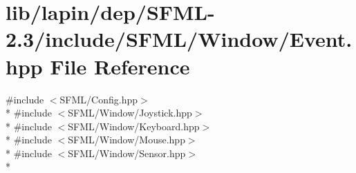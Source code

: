 \hypertarget{lib_2lapin_2dep_2_s_f_m_l-2_83_2include_2_s_f_m_l_2_window_2_event_8hpp}{\section{lib/lapin/dep/\-S\-F\-M\-L-\/2.3/include/\-S\-F\-M\-L/\-Window/\-Event.hpp File Reference}
\label{lib_2lapin_2dep_2_s_f_m_l-2_83_2include_2_s_f_m_l_2_window_2_event_8hpp}
}
{\ttfamily \#include $<$S\-F\-M\-L/\-Config.\-hpp$>$}\\*
{\ttfamily \#include $<$S\-F\-M\-L/\-Window/\-Joystick.\-hpp$>$}\\*
{\ttfamily \#include $<$S\-F\-M\-L/\-Window/\-Keyboard.\-hpp$>$}\\*
{\ttfamily \#include $<$S\-F\-M\-L/\-Window/\-Mouse.\-hpp$>$}\\*
{\ttfamily \#include $<$S\-F\-M\-L/\-Window/\-Sensor.\-hpp$>$}\\*

